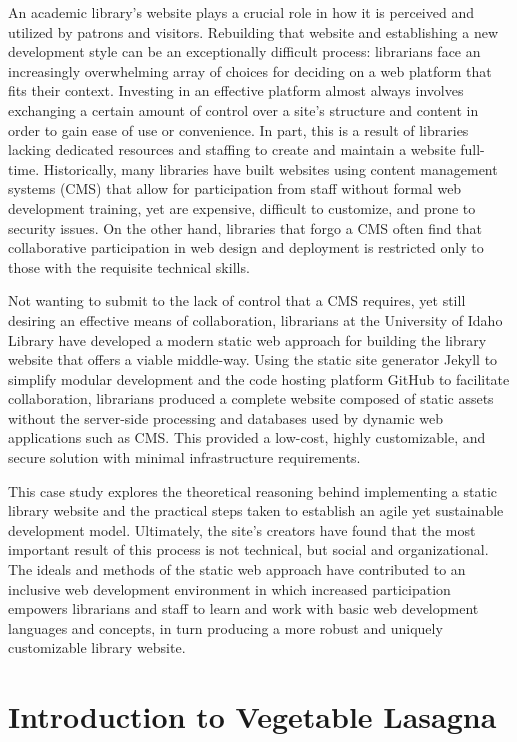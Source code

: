 \documentclass{book}
\begin{document}
An academic library's website plays a crucial role in how it is perceived and
utilized by patrons and visitors. Rebuilding that website and establishing a
new development style can be an exceptionally difficult process: librarians
face an increasingly overwhelming array of choices for deciding on a web
platform that fits their context. Investing in an effective platform almost
always involves exchanging a certain amount of control over a site's structure
and content in order to gain ease of use or convenience. In part, this is a
result of libraries lacking dedicated resources and staffing to create and
maintain a website full-time. Historically, many libraries have built websites
using content management systems (CMS) that allow for participation from staff
without formal web development training, yet are expensive, difficult to
customize, and prone to security issues. On the other hand, libraries that
forgo a CMS often find that collaborative participation in web design and
deployment is restricted only to those with the requisite technical skills.

Not wanting to submit to the lack of control that a CMS requires, yet still
desiring an effective means of collaboration, librarians at the University of
Idaho Library have developed a modern static web approach for building the
library website that offers a viable middle-way. Using the static site
generator Jekyll to simplify modular development and the code hosting platform
GitHub to facilitate collaboration, librarians produced a complete website
composed of static assets without the server-side processing and databases
used by dynamic web applications such as CMS. This provided a low-cost, highly
customizable, and secure solution with minimal infrastructure requirements.

This case study explores the theoretical reasoning behind implementing a
static library website and the practical steps taken to establish an agile yet
sustainable development model. Ultimately, the site's creators have found that
the most important result of this process is not technical, but social and
organizational. The ideals and methods of the static web approach have
contributed to an inclusive web development environment in which increased
participation empowers librarians and staff to learn and work with basic web
development languages and concepts, in turn producing a more robust and
uniquely customizable library website.

\hypertarget{introduction-to-vegetable-lasagna}{%
\chapter{Introduction to Vegetable
Lasagna}\label{introduction-to-vegetable-lasagna}}
\end{document}
